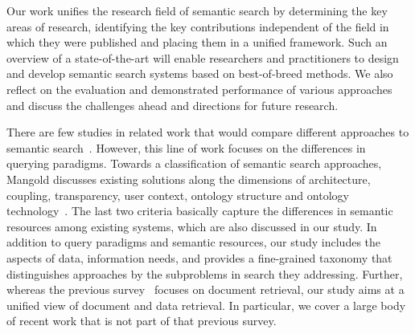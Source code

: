 Our work unifies the research field of semantic search by determining the key areas of research, identifying the key contributions independent of the field in which they were published and placing them in a unified framework. Such an overview of a state-of-the-art will enable researchers and practitioners to design and develop semantic search systems based on best-of-breed methods. We also reflect on the evaluation and demonstrated performance of various approaches and discuss the challenges ahead and directions for future research. 

There are few studies in related work that would compare different approaches to semantic search~\cite{DBLP:conf/semweb/KaufmannB07,DBLP:conf/esws/TranMH10}. However, this line of work focuses on the differences in querying paradigms. Towards a classification of semantic search approaches, Mangold discusses existing solutions along the dimensions of architecture, coupling, transparency, user context, ontology structure and ontology technology~\cite{DBLP:journals/ijmso/Mangold07}. The last two criteria basically capture the differences in semantic resources among existing systems, which are also discussed in our study. In addition to query paradigms and semantic resources, our study includes the aspects of data, information needs, and provides a fine-grained taxonomy that distinguishes approaches by the subproblems in search they addressing. Further, whereas the previous survey~\cite{DBLP:journals/ijmso/Mangold07} focuses on document retrieval, our study aims at a unified view of document and data retrieval. In particular, we cover a large body of recent work that is not part of that previous survey.  


 


